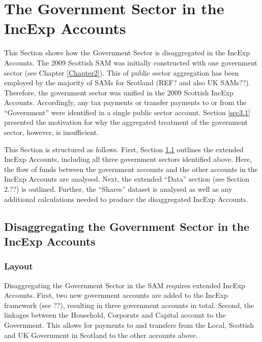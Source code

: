 \bigskip
\newpage 



\section{The Government Sector in the IncExp Accounts}
\label{sec:3.3}

This Section shows how the Government Sector is disaggregated in the IncExp Accounts. The 2009 Scottish SAM was initially constructed with one government sector (see Chapter \ref{Chapter2}). This of public sector aggregation has been employed by the majority of SAMs for Scotland (REF? and also UK SAMs??). Therefore, the government sector was unified in the 2009 Scottish IncExp Accounts. Accordingly, any tax payments or transfer payments to or from the ``Government'' were identified in a single public sector account. Section \ref{sec3.1} presented the motivation for why the aggregated treatment of the government sector, however, is insufficient.

\bigskip

This Section is structured as follows. First, Section \ref{sec:3.3.1} outlines the extended IncExp Accounts, including all three government sectors identified above. Here, the flow of funds between the government accounts and the other accounts in the IncExp Accounts are analysed. Next, the extended ``Data'' section (see Section 2.??) is outlined. Further, the ``Shares'' dataset is analysed as well as any additional calculations needed to produce the disaggregated IncExp Accounts.

\bigskip

\subsection{Disaggregating the Government Sector in the IncExp Accounts}
\label{sec:3.3.1}

\subsubsection{Layout}

Disaggregating the Government Sector in the SAM requires extended IncExp Accounts. First, two new government accounts are added to the IncExp framework (see ??), resulting in three government accounts in total. Second, the linkages between the Household, Corporate and Capital account to the Government. This allows for payments to and transfers from the Local, Scottish and UK Government in Scotland to the other accounts above.

